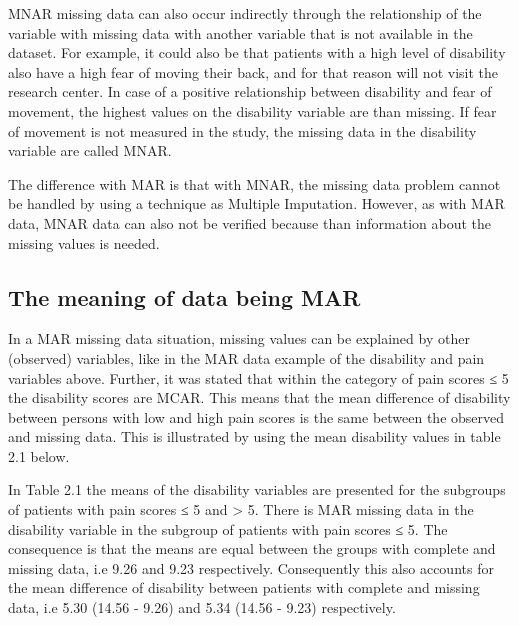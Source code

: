 \documentclass[
]{book}
\begin{document}
MNAR missing data can also occur indirectly through the relationship of the variable with missing data with another variable that is not available in the dataset. For example, it could also be that patients with a high level of disability also have a high fear of moving their back, and for that reason will not visit the research center. In case of a positive relationship between disability and fear of movement, the highest values on the disability variable are than missing. If fear of movement is not measured in the study, the missing data in the disability variable are called MNAR.

The difference with MAR is that with MNAR, the missing data problem cannot be handled by using a technique as Multiple Imputation. However, as with MAR data, MNAR data can also not be verified because than information about the missing values is needed.

\hypertarget{the-meaning-of-data-being-mar}{%
\subsection{The meaning of data being MAR}\label{the-meaning-of-data-being-mar}}

In a MAR missing data situation, missing values can be explained by other (observed) variables, like in the MAR data example of the disability and pain variables above. Further, it was stated that within the category of pain scores ≤ 5 the disability scores are MCAR. This means that the mean difference of disability between persons with low and high pain scores is the same between the observed and missing data. This is illustrated by using the mean disability values in table 2.1 below.

In Table 2.1 the means of the disability variables are presented for the subgroups of patients with pain scores ≤ 5 and \textgreater{} 5. There is MAR missing data in the disability variable in the subgroup of patients with pain scores ≤ 5. The consequence is that the means are equal between the groups with complete and missing data, i.e 9.26 and 9.23 respectively. Consequently this also accounts for the mean difference of disability between patients with complete and missing data, i.e 5.30 (14.56 - 9.26) and 5.34 (14.56 - 9.23) respectively.
\end{document}
